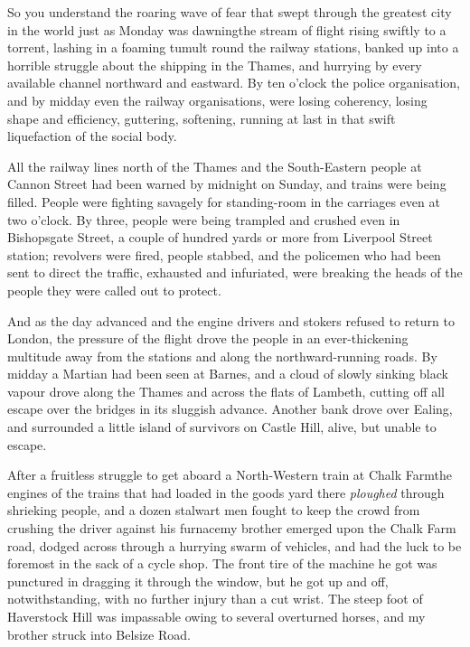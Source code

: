 So you understand the roaring wave of fear that swept through the
greatest city in the world just as Monday was dawning\dash{}the stream
of flight rising swiftly to a torrent, lashing in a foaming tumult
round the railway stations, banked up into a horrible struggle
about the shipping in the Thames, and hurrying by every available
channel northward and eastward. By ten o'clock the police
organisation, and by midday even the railway organisations, were
losing coherency, losing shape and efficiency, guttering,
softening, running at last in that swift liquefaction of the social
body.

All the railway lines north of the Thames and the South-Eastern
people at Cannon Street had been warned by midnight on Sunday, and
trains were being filled. People were fighting savagely for
standing-room in the carriages even at two o'clock. By three,
people were being trampled and crushed even in Bishopsgate Street,
a couple of hundred yards or more from Liverpool Street station;
revolvers were fired, people stabbed, and the policemen who had
been sent to direct the traffic, exhausted and infuriated, were
breaking the heads of the people they were called out to protect.

And as the day advanced and the engine drivers and stokers refused
to return to London, the pressure of the flight drove the people in
an ever-thickening multitude away from the stations and along the
northward-running roads. By midday a Martian had been seen at
Barnes, and a cloud of slowly sinking black vapour drove along the
Thames and across the flats of Lambeth, cutting off all escape over
the bridges in its sluggish advance. Another bank drove over
Ealing, and surrounded a little island of survivors on Castle Hill,
alive, but unable to escape.

After a fruitless struggle to get aboard a North-Western train at
Chalk Farm\dash{}the engines of the trains that had loaded in the goods
yard there \emph{ploughed} through shrieking people, and a dozen
stalwart men fought to keep the crowd from crushing the driver
against his furnace\dash{}my brother emerged upon the Chalk Farm road,
dodged across through a hurrying swarm of vehicles, and had the
luck to be foremost in the sack of a cycle shop. The front tire of
the machine he got was punctured in dragging it through the window,
but he got up and off, notwithstanding, with no further injury than
a cut wrist. The steep foot of Haverstock Hill was impassable owing
to several overturned horses, and my brother struck into Belsize
Road.

